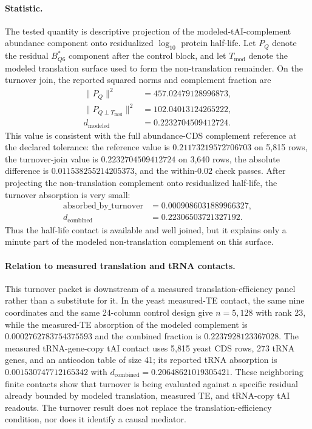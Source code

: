 \paragraph{Statistic.}
The tested quantity is descriptive projection of the modeled-tAI-complement abundance component onto residualized $\log_{10}$ protein half-life.  Let $P_Q$ denote the residual $B^*_{Q6}$ component after the control block, and let $T_{\mathrm{mod}}$ denote the modeled translation surface used to form the non-translation remainder.  On the turnover join, the reported squared norms and complement fraction are
$$
\begin{aligned}
\|P_Q\|^2 &= 457.02479128996873,\\
\|P_{Q\perp T_{\mathrm{mod}}}\|^2 &= 102.04013124265222,\\
d_{\mathrm{modeled}} &= 0.2232704509412724.
\end{aligned}
$$
This value is consistent with the full abundance-CDS complement reference at the declared tolerance: the reference value is $0.21173219572706703$ on 5,815 rows, the turnover-join value is $0.2232704509412724$ on 3,640 rows, the absolute difference is $0.011538255214205373$, and the within-$0.02$ check passes.  After projecting the non-translation complement onto residualized half-life, the turnover absorption is very small:
$$
\begin{aligned}
\mathrm{absorbed\_by\_turnover} &= 0.0009086031889966327,\\
d_{\mathrm{combined}} &= 0.22306503721327192.
\end{aligned}
$$
Thus the half-life contact is available and well joined, but it explains only a minute part of the modeled non-translation complement on this surface.

\paragraph{Relation to measured translation and tRNA contacts.}
This turnover packet is downstream of a measured translation-efficiency panel rather than a substitute for it.  In the yeast measured-TE contact, the same nine coordinates and the same 24-column control design give $n=5,128$ with rank $23$, while the measured-TE absorption of the modeled complement is $0.0002762783754375593$ and the combined fraction is $0.2237928123367028$.  The measured tRNA-gene-copy tAI contact uses 5,815 yeast CDS rows, 273 tRNA genes, and an anticodon table of size 41; its reported tRNA absorption is $0.001530747712165342$ with $d_{\mathrm{combined}}=0.20648621019305421$.  These neighboring finite contacts show that turnover is being evaluated against a specific residual already bounded by modeled translation, measured TE, and tRNA-copy tAI readouts.  The turnover result does not replace the translation-efficiency condition, nor does it identify a causal mediator.


